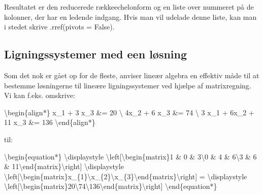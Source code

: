 \documentclass[letterpaper,10pt,english]{jupyterBook}
\begin{document}
\begin{sphinxVerbatim}[commandchars=\\\{\}]
  \PYG{p}{[}\PYG{p}{[}   \PYG{p}{]} \PYG{p}{[}   \PYG{p}{]} \PYG{p}{[}   \PYG{p}{]}\PYG{p}{]}
\end{sphinxVerbatim}

\noindent{}

\noindent{}

Resultatet er den reducerede række\sphinxhyphen{}echelonform og en liste over nummeret på de kolonner, der har en ledende indgang. Hvis man vil udelade denne liste, kan man i stedet skrive .rref(pivots = False).


\subsection{Ligningssystemer med een løsning}
\label{\detokenize{notebooks/sympy/Notebook_LinAlg1_5:ligningssystemer-med-een-losning}}
Som det nok er gået op for de fleste, anviser lineær algebra en effektiv måde til at bestemme løsningerne til lineære ligningssystemer ved hjælpe af matrixregning. Vi kan f.eks. omskrive:

\textbackslash{}begin\{align*\}
x\_1 + 3 x\_3 \&= 20 \textbackslash{} 4x\_2 + 6 x\_3 \&= 74 \textbackslash{} 3 x\_1 + 6x\_2 + 11 x\_3 \&= 136
\textbackslash{}end\{align*\}

til:

\textbackslash{}begin\{equation*\}
\textbackslash{}displaystyle \textbackslash{}left{[}\textbackslash{}begin\{matrix\}1 \& 0 \& 3\textbackslash{}0 \& 4 \& 6\textbackslash{}3 \& 6 \& 11\textbackslash{}end\{matrix\}\textbackslash{}right{]} \textbackslash{}displaystyle \textbackslash{}left{[}\textbackslash{}begin\{matrix\}x\_\{1\}\textbackslash{}x\_\{2\}\textbackslash{}x\_\{3\}\textbackslash{}end\{matrix\}\textbackslash{}right{]} = \textbackslash{}displaystyle \textbackslash{}left{[}\textbackslash{}begin\{matrix\}20\textbackslash{}74\textbackslash{}136\textbackslash{}end\{matrix\}\textbackslash{}right{]}
\textbackslash{}end\{equation*\}
\end{document}
